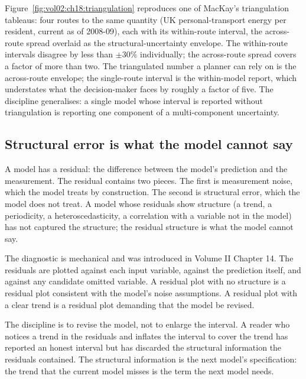 



Figure~\ref{fig:vol02:ch18:triangulation} reproduces one of MacKay's
triangulation tableaus: four routes to the same quantity (UK
personal-transport energy per resident, current as of 2008-09), each
with its within-route interval, the across-route spread overlaid as
the structural-uncertainty envelope. The within-route intervals
disagree by less than $\pm 30\%$ individually; the across-route
spread covers a factor of more than two. The triangulated number a
planner can rely on is the across-route envelope; the single-route
interval is the within-model report, which understates what the
decision-maker faces by roughly a factor of five. The discipline
generalises: a single model whose interval is reported without
triangulation is reporting one component of a multi-component
uncertainty.

\subsection{Structural error is what the model cannot say}

A model has a residual: the difference between the model's
prediction and the measurement. The residual contains two pieces.
The first is measurement noise, which the model treats by
construction. The second is structural error, which the model
does not treat. A model whose residuals show structure (a trend,
a periodicity, a heteroscedasticity, a correlation with a
variable not in the model) has not captured the structure; the
residual structure is what the model cannot say.

The diagnostic is mechanical and was introduced in Volume II
Chapter 14. The residuals are plotted against each input
variable, against the prediction itself, and against any
candidate omitted variable. A residual plot with no structure is
a residual plot consistent with the model's noise assumptions.
A residual plot with a clear trend is a residual plot demanding
that the model be revised.

The discipline is to revise the model, not to enlarge the
interval. A reader who notices a trend in the residuals and
inflates the interval to cover the trend has reported an honest
interval but has discarded the structural information the
residuals contained. The structural information is the next
model's specification: the trend that the current model misses
is the term the next model needs.

